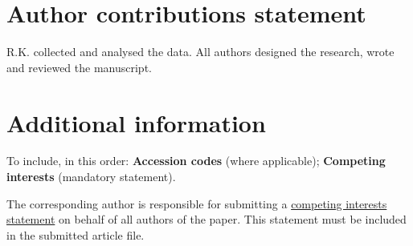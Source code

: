 \documentclass[fleqn,10pt]{wlscirep}
\begin{document}





\section*{Author contributions statement}
R.K. collected and analysed the data. All authors designed the research, wrote and reviewed the manuscript.

\section*{Additional information}

To include, in this order: \textbf{Accession codes} (where applicable); \textbf{Competing interests} (mandatory statement). 

The corresponding author is responsible for submitting a \href{http://www.nature.com/srep/policies/index.html#competing}{competing interests statement} on behalf of all authors of the paper. This statement must be included in the submitted article file.

\end{document}
